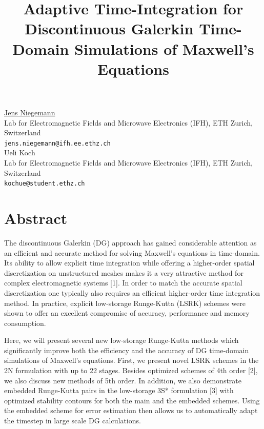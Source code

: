 \documentclass[article,A4,11pt]{llncs}%
\begin{document}
\title{Adaptive Time-Integration for Discontinuous Galerkin Time-Domain Simulations of Maxwell's Equations}
 \author{} \institute{}
\maketitle
\begin{center}
{\large \underline{Jens Niegemann}}\\
Lab for Electromagnetic Fields and Microwave Electronics (IFH), ETH Zurich, Switzerland\\
{\tt jens.niegemann@ifh.ee.ethz.ch}
\\ \vspace{4mm}
{\large Ueli Koch}\\
Lab for Electromagnetic Fields and Microwave Electronics (IFH), ETH Zurich, Switzerland\\
{\tt kochue@student.ethz.ch}
\end{center}

\section*{Abstract}
The discontinuous Galerkin (DG) approach has gained considerable attention as an efficient and accurate method for solving Maxwell's equations in time-domain. Its ability to allow explicit time integration while offering a higher-order spatial discretization on unstructured meshes makes it a very attractive method for complex electromagnetic systems [1]. In order to match the accurate spatial discretization one typically also requires an efficient higher-order time integration method. In practice, explicit low-storage Runge-Kutta (LSRK) schemes were shown to offer an excellent compromise of accuracy, performance and memory consumption.

Here, we will present several new low-storage Runge-Kutta methods which significantly improve both the efficiency and the accuracy of DG time-domain simulations of Maxwell's equations. First, we present novel LSRK schemes in the 2N formulation with up to 22 stages. Besides optimized schemes of 4th order [2], we also discuss new methods of 5th order. In addition, we also demonstrate embedded Runge-Kutta pairs in the low-storage 3S* formulation [3] with optimized stability contours for both the main and the embedded schemes. Using the embedded scheme for error estimation then allows us to automatically adapt the timestep in large scale DG calculations.
\end{document}
